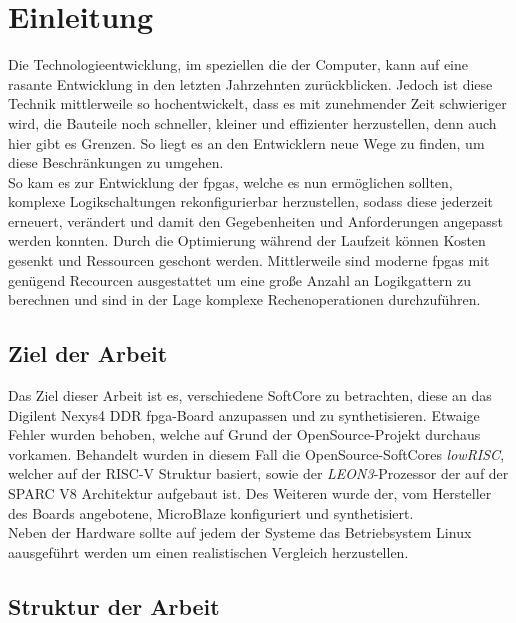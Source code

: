 \chapter{Einleitung}\label{ch:einleitung}

Die Technologieentwicklung, im speziellen die der Computer, kann auf eine rasante Entwicklung in den letzten
Jahrzehnten zurückblicken. Jedoch ist diese Technik mittlerweile so hochentwickelt, dass es mit zunehmender Zeit
schwieriger wird, die Bauteile noch schneller, kleiner und effizienter herzustellen, denn auch hier gibt es Grenzen.
So liegt es an den Entwicklern neue Wege zu finden, um diese Beschränkungen zu umgehen. \\
So kam es zur Entwicklung der \acp{fpga}, welche es nun ermöglichen sollten, komplexe Logikschaltungen
rekonfigurierbar herzustellen, sodass diese jederzeit erneuert, verändert und damit den Gegebenheiten und
Anforderungen angepasst werden konnten. Durch die Optimierung während der Laufzeit können Kosten gesenkt und
Ressourcen geschont werden. Mittlerweile sind moderne \acp{fpga} mit genügend Recourcen ausgestattet um eine
große Anzahl an Logikgattern zu berechnen und sind in der Lage komplexe Rechenoperationen durchzuführen.\\

\section{Ziel der Arbeit}\label{kap:zielderarbeit}

Das Ziel dieser Arbeit ist es, verschiedene SoftCore zu betrachten, diese an das Digilent Nexys4 DDR \ac{fpga}-Board anzupassen und zu synthetisieren. Etwaige Fehler wurden behoben,
welche auf Grund der OpenSource-Projekt durchaus vorkamen. Behandelt wurden in diesem Fall die OpenSource-SoftCores \emph{lowRISC}, welcher auf der RISC-V Struktur basiert, sowie der \emph{LEON3}-Prozessor
der auf der SPARC V8 Architektur aufgebaut ist. Des Weiteren wurde der, vom Hersteller des Boards angebotene, MicroBlaze konfiguriert und synthetisiert.\\
Neben der Hardware sollte auf jedem der Systeme das Betriebsystem Linux aausgeführt werden um einen realistischen Vergleich herzustellen.


 \section{Struktur der Arbeit}\label{kap:strukturderarbeit}

